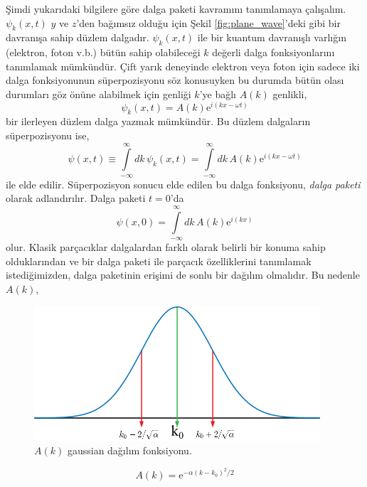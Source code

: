 \documentclass[a4paper,12pt, twoside]{article}
\begin{document}
Şimdi yukarıdaki bilgilere göre dalga paketi kavramını tanımlamaya çalışalım. $\psi_k(x,t)$ $y$ ve $z$'den bağımsız olduğu için Şekil \ref{fig:plane_wave}'deki gibi bir davranışa sahip düzlem dalgadır. $\psi_k(x,t)$ ile bir kuantum davranışlı varlığın (elektron, foton v.b.) bütün sahip olabileceği $k$ değerli dalga fonksiyonlarını tanımlamak mümkündür. Çift yarık deneyinde elektron veya foton için sadece iki dalga fonksiyonunun süperpozisyonu söz konusuyken bu durumda bütün olası durumları göz önüne alabilmek için genliği $k$'ye bağlı $A(k)$ genlikli,
\begin{equation}
\psi_k(x, t) = A(k) \text{e}^{i(kx - \omega t)} 
\label{eq:plane_wave_A_k}
\end{equation}
bir ilerleyen düzlem dalga yazmak mümkündür. Bu düzlem dalgaların süperpozisyonu ise,
\begin{equation}
\psi(x, t) \equiv \int\limits_{-\infty}^{\infty}dk\,\psi_k(x, t) = \int\limits_{-\infty}^{\infty}dk\,A(k) \text{e}^{i(kx - \omega t)} 
\label{eq:wave_packet}
\end{equation}
ile elde edilir. Süperpozisyon sonucu elde edilen bu dalga fonksiyonu, \emph{dalga paketi} olarak adlandırılır. Dalga paketi $t=0$'da
\begin{equation}
\psi(x, 0) = \int\limits_{-\infty}^{\infty}dk\,A(k) \text{e}^{i(kx)} 
\label{eq:wave_packet_t0_int}
\end{equation}
olur. Klasik parçacıklar dalgalardan farklı olarak belirli bir konuma sahip olduklarından ve bir dalga paketi ile parçacık özelliklerini tanımlamak istediğimizden, dalga paketinin erişimi de sonlu bir dağılım olmalıdır. Bu nedenle $A(k)$,
\begin{figure}[hbtp]
\center
\includegraphics[scale=1.5]{Gaussian_distribution.png}
\caption{$A(k)$ gaussian dağılım fonksiyonu.}
\label{fig:gaussian_dist}
\end{figure}
\begin{equation}
A(k) = \text{e}^{-\alpha (k-k_0)^2/2}
\label{eq:wave_packet_t0}
\end{equation}
\end{document}
